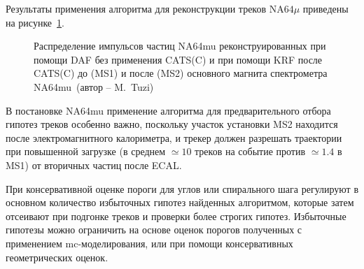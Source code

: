 Результаты применения алгоритма для реконструкции треков $\text{NA64}\mu$ приведены на
рисунке~\ref{fig:cats-impact-na64}.
\begin{figure}[ht]
    \caption{Распределение импульсов частиц NA64mu реконструированных при
    помощи DAF без применения CATS(C) и при помощи KRF после CATS(C)
    до (MS1) и после (MS2) основного магнита спектрометра NA64mu~(автор -- M.~Tuzi)}
    \label{fig:cats-impact-na64}
\end{figure}
В постановке NA64mu применение алгоритма для предварительного отбора гипотез треков
особенно важно, поскольку участок установки MS2 находится после электромагнитного
калориметра, и трекер должен разрешать траектории при повышенной
загрузке (в среднем $\simeq 10$ треков на событие против $\simeq 1.4$ в MS1)
от вторичных частиц после ECAL.

При консервативной оценке пороги для углов или спирального шага
регулируют в основном количество избыточных гипотез найденных алгоритмом, которые
затем отсеивают при подгонке треков и проверки более строгих гипотез. Избыточные
гипотезы можно ограничить на основе оценок порогов полученных с
применением \acrshort{mc}-моделирования, или при помощи консервативных
геометрических оценок.

